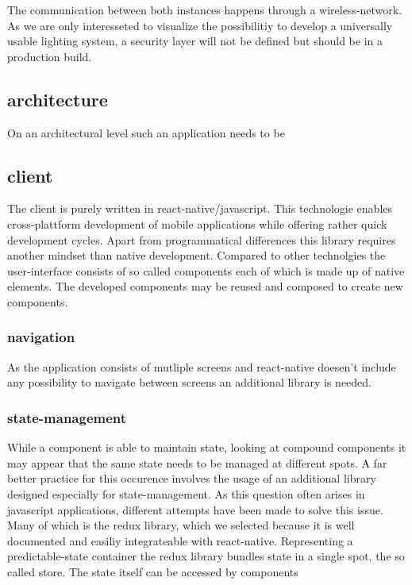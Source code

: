 \documentclass[conference]{IEEEtran}
\begin{document}
The communication between both instances happens through a wireless-network. As we are only interesseted to visualize the possibilitiy 
to develop a universally usable lighting system, a security layer will not be defined but should be in a production build. 


\subsection{architecture}
On an architectural level such an application needs to be 


\subsection{client}
The client is purely written in react-native/javascript. This technologie enables cross-plattform development of mobile applications while offering
rather quick development cycles. Apart from programmatical differences this library requires another mindset than native development.
Compared to other technolgies the user-interface consists of so called components each of which is made up of native elements. The developed components
may be reused and composed to create new components.


\subsubsection{navigation}
As the application consists of mutliple screens and react-native doesen't include any possibility to navigate between screens an additional
library is needed. 


\subsubsection{state-management}
While a component is able to maintain state, looking at compound components it may appear that the same state needs to be managed at different
spots. A far better practice for this occurence involves the usage of an additional library designed especially for state-management. As this
question often arises in javascript applications, different attempts have been made to solve this issue. Many of which is the redux library,
which we selected because it is well documented and easiliy integrateable with react-native. Representing a predictable-state container the redux
library bundles state in a single spot, the so called store. The state itself can be accessed by components 
\end{document}
